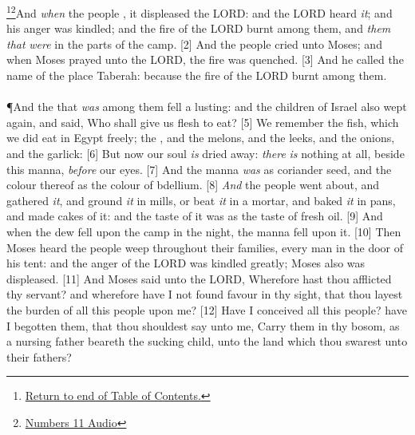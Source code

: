 \footnote{\textcolor[cmyk]{0.99998,1,0,0}{\hyperlink{TOC}{Return to end of Table of Contents.}}}\footnote{\href{https://audiobible.com/bible/numbers_11.html}{\textcolor[cmyk]{0.99998,1,0,0}{Numbers 11 Audio}}}\textcolor[cmyk]{0.99998,1,0,0}{And \emph{when} the people , it displeased the LORD: and the LORD heard \emph{it}; and his anger was kindled; and the fire of the LORD burnt among them, and  \emph{them} \emph{that} \emph{were} in the  parts of the camp.}
[2] \textcolor[cmyk]{0.99998,1,0,0}{And the people cried unto Moses; and when Moses prayed unto the LORD, the fire was quenched.}
[3] \textcolor[cmyk]{0.99998,1,0,0}{And he called the name of the place Taberah: because the fire of the LORD burnt among them.}\\
\\
\P \textcolor[cmyk]{0.99998,1,0,0}{And the  that \emph{was} among them fell a lusting: and the children of Israel also wept again, and said, Who shall give us flesh to eat?}
[5] \textcolor[cmyk]{0.99998,1,0,0}{We remember the fish, which we did eat in Egypt freely; the , and the melons, and the leeks, and the onions, and the garlick:}
[6] \textcolor[cmyk]{0.99998,1,0,0}{But now our soul \emph{is} dried away: \emph{there} \emph{is} nothing at all, beside this manna, \emph{before} our eyes.}
[7] \textcolor[cmyk]{0.99998,1,0,0}{And the manna \emph{was} as coriander seed, and the colour thereof as the colour of bdellium.}
[8] \textcolor[cmyk]{0.99998,1,0,0}{\emph{And} the people went about, and gathered \emph{it}, and ground \emph{it} in mills, or beat \emph{it} in a mortar, and baked \emph{it} in pans, and made cakes of it: and the taste of it was as the taste of fresh oil.}
[9] \textcolor[cmyk]{0.99998,1,0,0}{And when the dew fell upon the camp in the night, the manna fell upon it.}
[10] \textcolor[cmyk]{0.99998,1,0,0}{Then Moses heard the people weep throughout their families, every man in the door of his tent: and the anger of the LORD was kindled greatly; Moses also was displeased.}
[11] \textcolor[cmyk]{0.99998,1,0,0}{And Moses said unto the LORD, Wherefore hast thou afflicted thy servant? and wherefore have I not found favour in thy sight, that thou layest the burden of all this people upon me?}
[12] \textcolor[cmyk]{0.99998,1,0,0}{Have I conceived all this people? have I begotten them, that thou shouldest say unto me, Carry them in thy bosom, as a nursing father beareth the sucking child, unto the land which thou swarest unto their fathers?}
